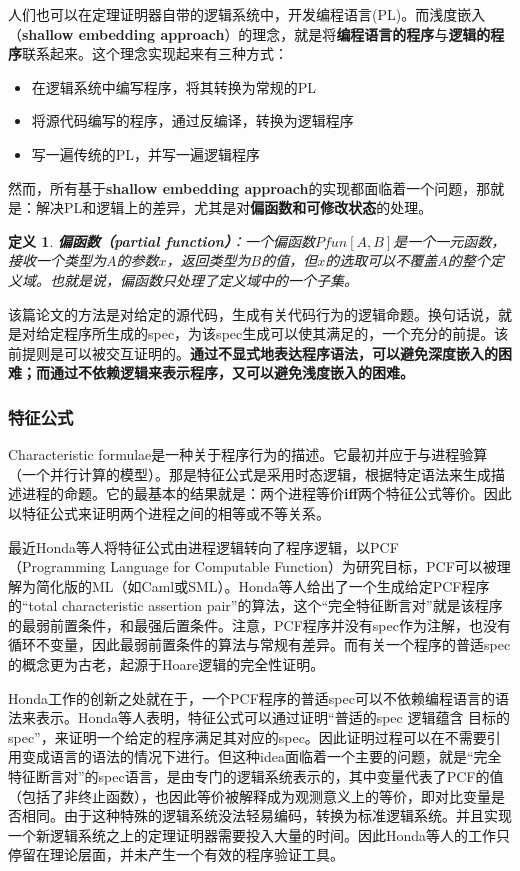 \documentclass[a4paper,11pt]{article}
\newtheorem {definition}{定义}
\begin{document}
	人们也可以在定理证明器自带的逻辑系统中，开发编程语言(PL)。而浅度嵌入
（\textbf{shallow embedding approach}）的理念，就是将\textbf{编程语言的程序}与\textbf{逻辑的程序}联系起来。这个理念实现起来有三种方式：
	\begin{itemize}
		\item 在逻辑系统中编写程序，将其转换为常规的PL
		\item 将源代码编写的程序，通过反编译，转换为逻辑程序
		\item 写一遍传统的PL，并写一遍逻辑程序
	\end{itemize}

	然而，所有基于\textbf{shallow embedding approach}的实现都面临着一个问题，那就是：解决PL和逻辑上的差异，尤其是对\textbf{偏函数和可修改状态}的处理。
	
	\begin{definition}
		\textbf{偏函数（partial function）}：一个偏函数$Pfun[A,B]$是一个一元函数，接收一个类型为$A$的参数$x$，返回类型为$B$的值，但$x$的选取可以不覆盖$A$的整个定义域。也就是说，偏函数只处理了定义域中的一个子集。
	\end{definition}
	该篇论文的方法是对给定的源代码，生成有关代码行为的逻辑命题。换句话说，就是对给定程序所生成的spec，为该spec生成可以使其满足的，一个充分的前提。该前提则是可以被交互证明的。\textbf{通过不显式地表达程序语法，可以避免深度嵌入的困难；而通过不依赖逻辑来表示程序，又可以避免浅度嵌入的困难。}
\subsubsection{特征公式}
	Characteristic formulae是一种关于程序行为的描述。它最初并应于与进程验算（一个并行计算的模型）。那是特征公式是采用时态逻辑，根据特定语法来生成描述进程的命题。它的最基本的结果就是：两个进程等价\textbf{iff}两个特征公式等价。因此以特征公式来证明两个进程之间的相等或不等关系。

	最近Honda等人将特征公式由进程逻辑转向了程序逻辑，以PCF\\
（Programming Language for Computable Function）为研究目标，PCF可以被理解为简化版的ML（如Caml或SML）。Honda等人给出了一个生成给定PCF程序的“total characteristic assertion pair”的算法，这个“完全特征断言对”就是该程序的最弱前置条件，和最强后置条件。注意，PCF程序并没有spec作为注解，也没有循环不变量，因此最弱前置条件的算法与常规有差异。而有关一个程序的普适spec的概念更为古老，起源于Hoare逻辑的完全性证明。
	
	Honda工作的创新之处就在于，一个PCF程序的普适spec可以不依赖编程语言的语法来表示。Honda等人表明，特征公式可以通过证明“普适的spec 逻辑蕴含 目标的spec”，来证明一个给定的程序满足其对应的spec。因此证明过程可以在不需要引用变成语言的语法的情况下进行。但这种idea面临着一个主要的问题，就是“完全特征断言对”的spec语言，是由专门的逻辑系统表示的，其中变量代表了PCF的值（包括了非终止函数），也因此等价被解释成为观测意义上的等价，即对比变量是否相同。由于这种特殊的逻辑系统没法轻易编码，转换为标准逻辑系统。并且实现一个新逻辑系统之上的定理证明器需要投入大量的时间。因此Honda等人的工作只停留在理论层面，并未产生一个有效的程序验证工具。
\end{document}
